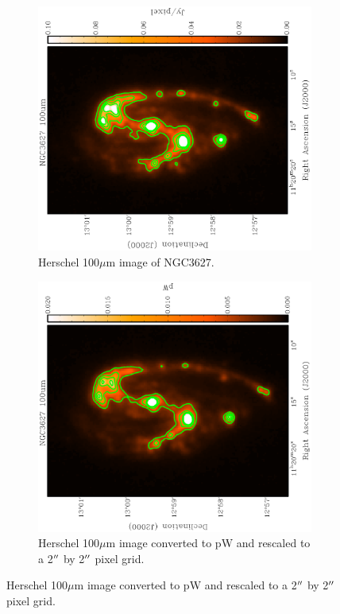 \begin{figure}
  \centering
  \begin{subfigure}[t]{.48\textwidth}
    \centering
    \includegraphics[width=1.\linewidth, angle=270]{obs_imgs/100um_original.eps}
    \caption{Herschel 100$\mu$m image of NGC3627.}
  \end{subfigure}%
  \quad
  \begin{subfigure}[t]{.48\textwidth}
    \centering
    \includegraphics[width=1.\linewidth, angle=270]{obs_imgs/100um_align_2as.eps}
    \caption{Herschel 100$\mu$m image converted to pW and rescaled to a 2$\mbox{$^{\prime\prime}$}$ by 2$\mbox{$^{\prime\prime}$}$ pixel grid.}
  \end{subfigure}%


\end{figure}
